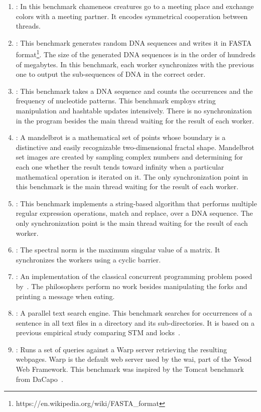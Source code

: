 \begin{enumerate}
  \item \label{bench:chameneos}\chameneos: In this benchmark chameneos creatures go to a meeting place and exchange colors with a meeting partner. It encodes symmetrical cooperation between threads.

  \item \fasta:  This benchmark generates random DNA sequences and writes it in FASTA format\footnote{https://en.wikipedia.org/wiki/FASTA\_format}. The size of the generated DNA sequences is in the order of hundreds of megabytes. In this benchmark,  each worker synchronizes with the previous one to output the sub-sequences of DNA in the correct order.

  \item \knucleotide: This benchmark takes a DNA sequence and counts the occurrences and the frequency of nucleotide patterns. This benchmark employs string manipulation and hashtable updates intensively. There is no synchronization in the program besides the main thread waiting for the result of each worker.

  \item \mandelbrot: A mandelbrot is a mathematical set of points whose boundary is a distinctive and easily recognizable two-dimensional fractal shape. Mandelbrot set images are created by sampling complex numbers and determining for each one whether the result tends toward infinity when a particular mathematical operation is iterated on it. The only synchronization point in this benchmark is the main thread waiting for the result of each worker.

  \item \regex: This benchmark implements a string-based algorithm that performs multiple regular expression operations, match and replace, over a DNA sequence. The only synchronization point is the main thread waiting for the result of each worker.

  \item \label{bench:spectral}\spectral: The spectral norm is the maximum singular value of a matrix. It synchronizes the workers using a cyclic barrier.

  \item \label{bench:dining}\dining: An implementation of the classical concurrent programming problem posed by~. The philosophers perform no work besides manipulating the forks and printing a message when eating.

  \item \label{bench:tsearch}\tsearch: A parallel text search engine. This benchmark searches for occurrences of a sentence in all text files in a directory and its sub-directories. It is based on a previous empirical study comparing STM and locks~\cite{pankratius:2011}.

  \item \label{bench:warp}\warp: Runs a set of queries against a Warp server retrieving the resulting webpages. Warp is the default web server used by the \ac{wai}, part of the Yesod Web Framework. This benchmark was inspired by the Tomcat benchmark from DaCapo~\cite{blackburn:2006}.
\end{enumerate}

